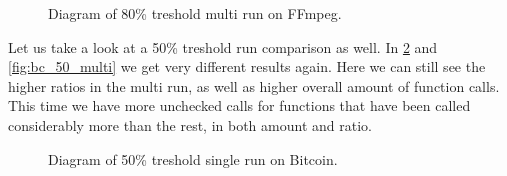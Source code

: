 \begin{figure}[H]
	\caption{Diagram of 80\% treshold multi run on FFmpeg.}
	\label{fig:ff_80_multi}
\end{figure}

Let us take a look at a 50\% treshold run comparison as well. In \cref{fig:bc_50_single} and \cref{fig:bc_50_multi} we get very different
results again. Here we can still see the higher ratios in the multi run, as well as higher overall amount of function calls. This time we
have more unchecked calls for functions that have been called considerably more than the rest, in both amount and ratio.

\begin{figure}[H]
	\caption{Diagram of 50\% treshold single run on Bitcoin.}
	\label{fig:bc_50_single}
\end{figure}

